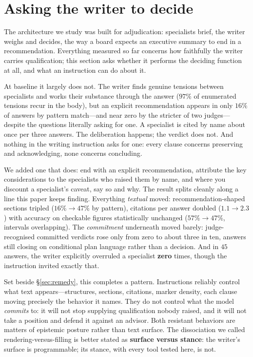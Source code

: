 \documentclass[11pt]{article}
\begin{document}
\section{Asking the writer to decide}
\label{sec:decide}
The architecture we study was built for adjudication: specialists brief, the
writer weighs and decides, the way a board expects an executive summary to
end in a recommendation. Everything measured so far concerns how faithfully
the writer carries qualification; this section asks whether it performs the
deciding function at all, and what an instruction can do about it.

At baseline it largely does not. The writer finds genuine tensions between
specialists and works their substance through the answer ($97\%$ of
enumerated tensions recur in the body), but an explicit recommendation
appears in only $16\%$ of answers by pattern match---and near zero by the
stricter of two judges---despite the questions literally asking for one. A
specialist is cited by name about once per three answers. The deliberation
happens; the verdict does not. And nothing in the writing instruction asks
for one: every clause concerns preserving and acknowledging, none concerns
concluding.

We added one that does: end with an explicit recommendation, attribute the
key considerations to the specialists who raised them by name, and where you
discount a specialist's caveat, say so and why. The result splits cleanly
along a line this paper keeps finding. Everything \emph{textual} moved:
recommendation-shaped sections tripled ($16\% \rightarrow 47\%$ by pattern),
citations per answer doubled ($1.1 \rightarrow 2.3$) with accuracy on
checkable figures statistically unchanged ($57\% \rightarrow 47\%$,
intervals overlapping). The \emph{commitment} underneath moved barely:
judge-recognised committed verdicts rose only from zero to about three in
ten, answers still closing on conditional plan language rather than a
decision. And in $45$ answers, the writer explicitly overruled a specialist
\textbf{zero} times, though the instruction invited exactly that.

Set beside \S\ref{sec:remedy}, this completes a pattern. Instructions
reliably control what text appears---structures, sections, citations, marker
density, each clause moving precisely the behavior it names. They do not
control what the model \emph{commits} to: it will not stop supplying
qualification nobody raised, and it will not take a position and defend it
against an advisor. Both resistant behaviors are matters of epistemic
posture rather than text surface. The dissociation we called
rendering-versus-filling is better stated as \textbf{surface versus
stance}: the writer's surface is programmable; its stance, with every tool
tested here, is not.
\end{document}
